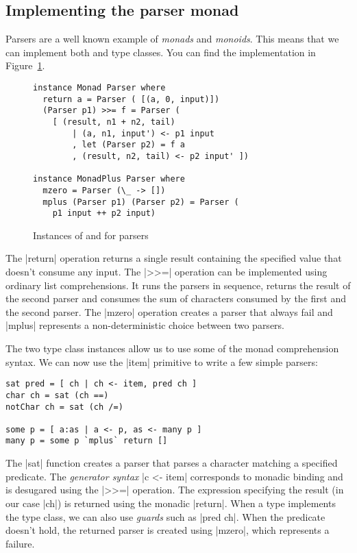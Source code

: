 \documentclass{tmr}
\begin{document}

\subsection{Implementing the parser monad}
Parsers are a well known example of \textit{monads} and \textit{monoids}. This means that we can 
implement both  and  type classes. You
can find the implementation in Figure~\ref{fig:monad-instance}.

\begin{figure}
\begin{verbatim}
instance Monad Parser where
  return a = Parser ( [(a, 0, input)])
  (Parser p1) >>= f = Parser (
    [ (result, n1 + n2, tail) 
        | (a, n1, input') <- p1 input
        , let (Parser p2) = f a
        , (result, n2, tail) <- p2 input' ])

instance MonadPlus Parser where 
  mzero = Parser (\_ -> [])
  mplus (Parser p1) (Parser p2) = Parser (
    p1 input ++ p2 input)
\end{verbatim}
\caption{Instances of  and  for parsers}
\label{fig:monad-instance}
\end{figure}

The |return| operation returns a single result containing the specified value that doesn't consume
any input. The |>>=| operation can be implemented using ordinary list comprehensions.
It runs the parsers in sequence, returns the result of the second parser and consumes the sum of 
characters consumed by the first and the second parser. The |mzero| operation creates a parser that 
always fail and |mplus| represents a non-deterministic
choice between two parsers. 

The two type class instances allow us to use some of the monad comprehension syntax. We can now 
use the |item| primitive to write a few simple parsers:

\begin{verbatim}
sat pred = [ ch | ch <- item, pred ch ]
char ch = sat (ch ==)
notChar ch = sat (ch /=)

some p = [ a:as | a <- p, as <- many p ]
many p = some p `mplus` return []
\end{verbatim}
The |sat| function creates a parser that parses a character matching a specified predicate. 
The \textit{generator syntax} |c <- item| corresponds to monadic binding and is desugared using 
the |>>=| operation. The expression specifying the result (in our case |ch|) is returned using
the monadic |return|. When a type implements the  type class, 
we can also use \textit{guards} such as |pred ch|. When the predicate doesn't hold, the returned 
parser is created using |mzero|, which represents a failure.
\end{document}
